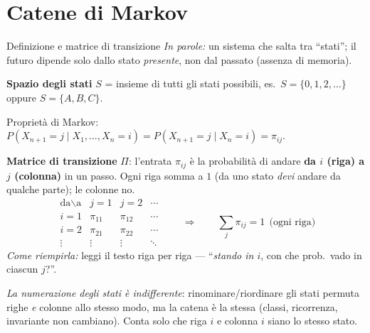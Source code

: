 \documentclass[11pt]{article}
\newcommand{\inparole}[1]{\emph{In parole:} #1}
\begin{document}
\newpage
\section{Catene di Markov}

\begin{concetto}[barPurple]{Definizione e matrice di transizione}
\inparole{un sistema che salta tra ``stati''; il futuro dipende solo dallo stato \emph{presente}, non dal passato (assenza di memoria).}

\textbf{Spazio degli stati} $S$ = insieme di tutti gli stati possibili, es.\ $S=\{0,1,2,\dots\}$ oppure $S=\{A,B,C\}$.

Propriet\`a di Markov: $P(X_{n+1}=j \mid X_1,\dots,X_n=i) = P(X_{n+1}=j\mid X_n=i)=\pi_{ij}$.

\textbf{Matrice di transizione} $\Pi$: l'entrata $\pi_{ij}$ \`e la probabilit\`a di andare \textbf{da $i$ (riga) a $j$ (colonna)} in un passo. Ogni riga somma a $1$ (da uno stato \emph{devi} andare da qualche parte); le colonne no.
\[
\begin{array}{c|ccc}
 \text{da}\backslash\text{a} & j{=}1 & j{=}2 & \cdots \\ \hline
 i{=}1 & \pi_{11} & \pi_{12} & \cdots \\
 i{=}2 & \pi_{21} & \pi_{22} & \cdots \\
 \vdots & \vdots & \vdots & \ddots
\end{array}
\qquad\Longrightarrow\qquad \sum_{j} \pi_{ij}=1 \ \ \text{(ogni riga)}
\]
\emph{Come riempirla:} leggi il testo riga per riga --- ``\emph{stando in $i$}, con che prob.\ vado in ciascun $j$?''.

\emph{La numerazione degli stati \`e indifferente}: rinominare/riordinare gli stati permuta righe \emph{e} colonne allo stesso modo, ma la catena \`e la stessa (classi, ricorrenza, invariante non cambiano). Conta solo che riga $i$ e colonna $i$ siano lo stesso stato.
\end{concetto}
\end{document}
